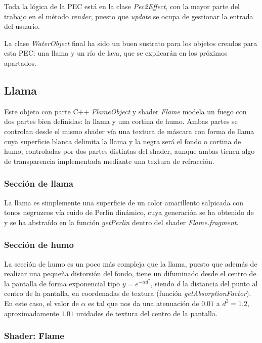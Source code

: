 \documentclass[12pt]{article}%
\begin{document}
	Toda la lógica de la PEC está en la clase \textit{Pec2Effect}, con la mayor parte del trabajo en el método \textit{render}, puesto que \textit{update} se ocupa de gestionar la entrada del usuario.
	
	La clase \textit{WaterObject} final ha sido un buen sustrato para los objetos creados para esta PEC: una llama y un río de lava, que se explicarán en los próximos apartados.

\subsection{Llama}
	Este objeto con parte C++ \textit{FlameObject} y shader \textit{Flame} modela un fuego con dos partes bien definidas: la llama y una cortina de humo. Ambas partes se controlan desde el mismo shader vía una textura de máscara con forma de llama cuya superficie blanca delimita la llama y la negra será el fondo o cortina de humo, controladas por dos partes distintas del shader, aunque ambas tienen algo de transparencia implementada mediante una textura de refracción.

\subsubsection{Sección de llama}
	La llama es simplemente una superficie de un color amarillento salpicada con tonos negruzcos vía ruido de Perlin dinámico, cuya generación se ha obtenido de \cite{perlin-wlgl} y se ha abstraído en la función \textit{getPerlin} dentro del shader \textit{Flame.fragment}.
	
\subsubsection{Sección de humo}
	La sección de humo es un poco más compleja que la llama, puesto que además de realizar una pequeña distorsión del fondo, tiene un difuminado desde el centro de la pantalla de forma exponencial tipo $y=e^{-\alpha d^2}$,  siendo $d$ la distancia del punto al centro de la pantalla, en coordenadas de textura (función \textit{getAbsorptionFactor}). En este caso, el valor de $\alpha$ es tal que nos da una atenuación de $0.01$ a $d^2=1.2$, aproximadamente $1.01$ unidades de textura del centro de la pantalla.

\subsubsection{Shader: Flame}
\end{document}
